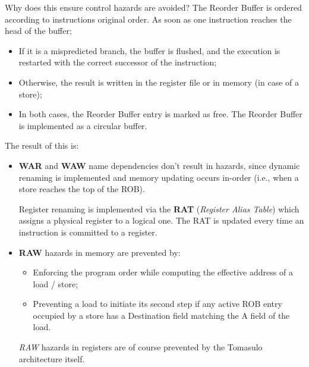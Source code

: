 \documentclass[a4paper,11pt]{article}
\begin{document}
\par\smallskip

Why does this ensure control hazards are avoided?
The Reorder Buffer is ordered according to instructions
original order.
As soon as one instruction reaches the head of the buffer;
\begin{itemize}
	\item If it is a mispredicted branch, the buffer is flushed, and
	      the execution is restarted with the correct successor of
	      the instruction;
	\item Otherwise, the result is written in the register file or in
	      memory (in case of a store);
	\item In both cases, the Reorder Buffer entry is marked as free.
	      The Reorder Buffer is implemented as a circular buffer.
\end{itemize}

\par\smallskip

The result of this is:
\begin{itemize}
	\item \textbf{WAR} and \textbf{WAW} name dependencies don't result in hazards, since dynamic renaming is implemented and memory updating occurs in-order (i.e., when a store reaches the top of the ROB).

	      Register renaming is implemented via the \textbf{RAT} (\textit{Register Alias Table}) which assigns a physical register to a logical one. The RAT is updated every time an instruction is committed to a register.

	\item \textbf{RAW} hazards in memory are prevented by:
	      \begin{itemize}
		      \item Enforcing the program order while computing the
		            effective address of a load / store;
		      \item Preventing a load to initiate its second step if any
		            active ROB entry occupied by a store has a
		            Destination field matching the A field of the load.
	      \end{itemize}

	      \textit{RAW} hazards in registers are of course prevented by the Tomasulo architecture itself.
\end{itemize}
\end{document}
